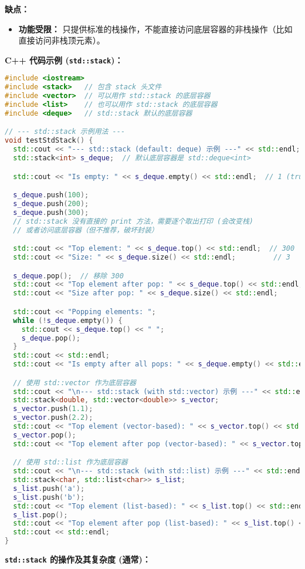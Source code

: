 \textbf{缺点：}

\begin{itemize}
	\item \textbf{功能受限：} 只提供标准的栈操作，不能直接访问底层容器的非栈操作（比如直接访问非栈顶元素）。
\end{itemize}

\textbf{C++ 代码示例 (\lstinline{std::stack})：}

\begin{lstlisting}[language=C++]
#include <iostream>
#include <stack>   // 包含 stack 头文件
#include <vector>  // 可以用作 std::stack 的底层容器
#include <list>    // 也可以用作 std::stack 的底层容器
#include <deque>   // std::stack 默认的底层容器

// --- std::stack 示例用法 ---
void testStdStack() {
  std::cout << "--- std::stack (default: deque) 示例 ---" << std::endl;
  std::stack<int> s_deque;  // 默认底层容器是 std::deque<int>

  std::cout << "Is empty: " << s_deque.empty() << std::endl;  // 1 (true)

  s_deque.push(100);
  s_deque.push(200);
  s_deque.push(300);
  // std::stack 没有直接的 print 方法，需要逐个取出打印 (会改变栈)
  // 或者访问底层容器（但不推荐，破坏封装）

  std::cout << "Top element: " << s_deque.top() << std::endl;  // 300
  std::cout << "Size: " << s_deque.size() << std::endl;         // 3

  s_deque.pop();  // 移除 300
  std::cout << "Top element after pop: " << s_deque.top() << std::endl;  // 200
  std::cout << "Size after pop: " << s_deque.size() << std::endl;         // 2

  std::cout << "Popping elements: ";
  while (!s_deque.empty()) {
    std::cout << s_deque.top() << " ";
    s_deque.pop();
  }
  std::cout << std::endl;
  std::cout << "Is empty after all pops: " << s_deque.empty() << std::endl;  // 1 (true)

  // 使用 std::vector 作为底层容器
  std::cout << "\n--- std::stack (with std::vector) 示例 ---" << std::endl;
  std::stack<double, std::vector<double>> s_vector;
  s_vector.push(1.1);
  s_vector.push(2.2);
  std::cout << "Top element (vector-based): " << s_vector.top() << std::endl;  // 2.2
  s_vector.pop();
  std::cout << "Top element after pop (vector-based): " << s_vector.top() << std::endl;  // 1.1

  // 使用 std::list 作为底层容器
  std::cout << "\n--- std::stack (with std::list) 示例 ---" << std::endl;
  std::stack<char, std::list<char>> s_list;
  s_list.push('a');
  s_list.push('b');
  std::cout << "Top element (list-based): " << s_list.top() << std::endl;  // 'b'
  s_list.pop();
  std::cout << "Top element after pop (list-based): " << s_list.top() << std::endl;  // 'a'
  std::cout << std::endl;
}
\end{lstlisting}
\textbf{\lstinline{std::stack} 的操作及其复杂度 (通常)：}

